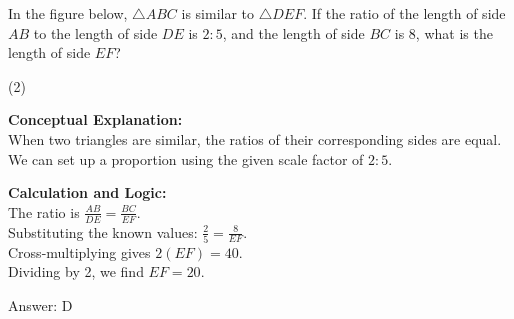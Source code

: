 \documentclass[11pt,paper=a4,answers]{exam}
\begin{document}
\begin{questions}
\pointsinrightmargin
\pointsdroppedatright
\marksnotpoints
{}
\pointformat{\boldmath\themarginpoints}
\bracketedpoints



\question
In the figure below, $\triangle ABC$ is similar to $\triangle DEF$. If the ratio of the length of side $AB$ to the length of side $DE$ is $2:5$, and the length of side $BC$ is 8, what is the length of side $EF$?
\begin{center}
\end{center}
\begin{tasks}(2)
\end{tasks}

\begin{solution}
\textbf{Conceptual Explanation:} \\
When two triangles are similar, the ratios of their corresponding sides are equal. We can set up a proportion using the given scale factor of $2:5$.

\vspace{10pt}
\textbf{Calculation and Logic:} \\
The ratio is $\frac{AB}{DE} = \frac{BC}{EF}$. \\
Substituting the known values: $\frac{2}{5} = \frac{8}{EF}$. \\
Cross-multiplying gives $2(EF) = 40$. \\
Dividing by 2, we find $EF = 20$.

\vspace{15pt}
Answer: \colorbox{yellow!100}{D}
\end{solution}


\end{questions}
\end{document}
